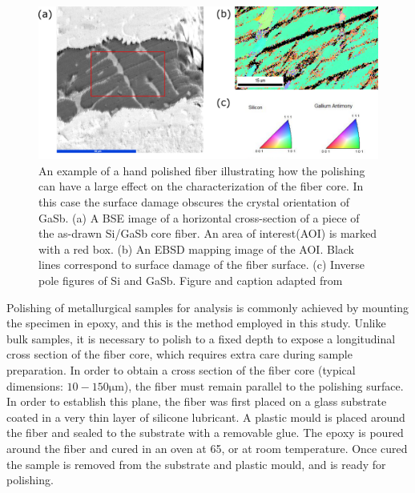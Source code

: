 \begin{figure}[]
    \centering
    \includegraphics[width=\textwidth]{fig/ebsd.png}
    \caption{An example of a hand polished fiber illustrating how the polishing can have a large effect on the characterization of the fiber core. In this case the surface damage obscures the crystal orientation of GaSb. (a) A BSE image of a horizontal cross-section of a piece of the as-drawn Si/GaSb core fiber.  An area of interest(AOI) is marked with a red box.  (b) An EBSD mapping image of the AOI. Black lines correspond to surface damage of the fiber surface. (c) Inverse pole figures of Si and GaSb. Figure and caption adapted from \cite{Song2017Si/GaSbFiber}}
    \label{fig:ebsd}
\end{figure}

Polishing of metallurgical samples for analysis is commonly achieved by mounting the specimen in epoxy, and this is the method employed in this study. Unlike bulk samples, it is necessary to polish to a fixed depth to expose a longitudinal cross section of the fiber core, which requires extra care during sample preparation. In order to obtain a cross section of the fiber core (typical dimensions: $10 - 150 \si{\micro\meter}$), the fiber must remain parallel to the polishing surface. In order to establish this plane, the fiber was first placed on a glass substrate coated in a very thin layer of silicone lubricant. A plastic mould is placed around the fiber and sealed to the substrate with a removable glue. The epoxy is poured around the fiber and cured in an oven at 65, or at room temperature. Once cured the sample is removed from the substrate and plastic mould, and is ready for polishing. 
